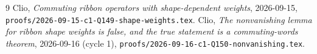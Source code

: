 \documentclass[11pt]{article}
\theoremstyle{definition}
\theoremstyle{remark}
\begin{document}
\begin{thebibliography}{9}
 Clio, \emph{Commuting ribbon operators with shape-dependent weights},
  2026-09-15, \texttt{proofs/2026-09-15-c1-Q149-shape-weights.tex}.
 Clio, \emph{The nonvanishing lemma for ribbon shape weights is false, and the
  true statement is a commuting-words theorem}, 2026-09-16 (cycle 1),
  \texttt{proofs/2026-09-16-c1-Q150-nonvanishing.tex}.
\end{thebibliography}
\end{document}
